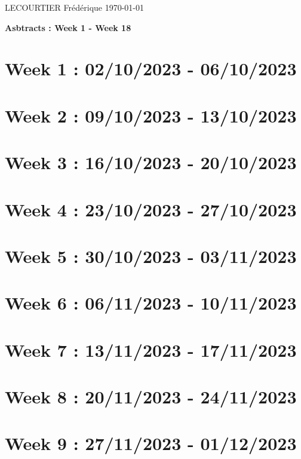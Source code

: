 \documentclass[french]{article}
\begin{document}
	LECOURTIER Frédérique \hfill \today
	\begin{center}
		\Large\textbf{{Asbtracts : Week 1 - Week 18}}
	\end{center}

	\section{Week 1 : 02/10/2023 - 06/10/2023}
	

	\section{Week 2 : 09/10/2023 - 13/10/2023}
	

	\section{Week 3 : 16/10/2023 - 20/10/2023}
	

	\section{Week 4 : 23/10/2023 - 27/10/2023}
	

	\section{Week 5 : 30/10/2023 - 03/11/2023}
	

	\section{Week 6 : 06/11/2023 - 10/11/2023}
	

	\section{Week 7 : 13/11/2023 - 17/11/2023}
	

	\section{Week 8 : 20/11/2023 - 24/11/2023}
	

	\section{Week 9 : 27/11/2023 - 01/12/2023}
	
\end{document}
